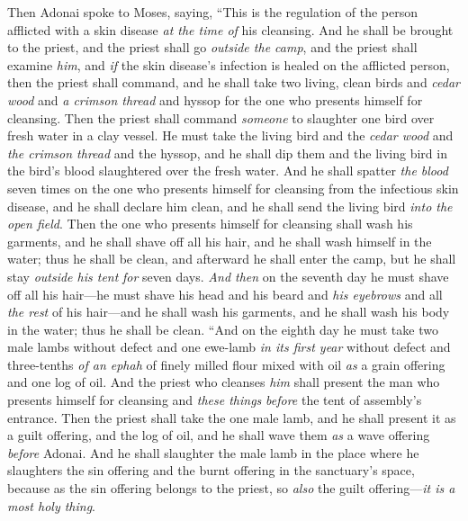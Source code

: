\begin{biblechapter} %
 Then Adonai spoke to Moses, saying,
\verse “This is the regulation of the person afflicted with a skin disease \textit{at the time of} his cleansing. And he shall be brought to the priest,
\verse and the priest shall go \textit{outside the camp}, and the priest shall examine \textit{him}, and \textit{if} the skin disease’s infection is healed on the afflicted person,
\verse then the priest shall command, and he shall take two living, clean birds and \textit{cedar wood} and \textit{a crimson thread} and hyssop for the one who presents himself for cleansing.
\verse Then the priest shall command \textit{someone} to slaughter one bird over fresh water in a clay vessel.
\verse He must take the living bird and the \textit{cedar wood} and \textit{the crimson thread} and the hyssop, and he shall dip them and the living bird in the bird’s blood slaughtered over the fresh water.
\verse And he shall spatter \textit{the blood} seven times on the one who presents himself for cleansing from the infectious skin disease, and he shall declare him clean, and he shall send the living bird \textit{into the open field}.
\verse Then the one who presents himself for cleansing shall wash his garments, and he shall shave off all his hair, and he shall wash himself in the water; thus he shall be clean, and afterward he shall enter the camp, but he shall stay \textit{outside his tent} \textit{for} seven days.
\verse \textit{And then} on the seventh day he must shave off all his hair—he must shave his head and his beard and \textit{his eyebrows} and all \textit{the rest} of his hair—and he shall wash his garments, and he shall wash his body in the water; thus he shall be clean.
\verse “And on the eighth day he must take two male lambs without defect and one ewe-lamb \textit{in its first year} without defect and three-tenths \textit{of an ephah} of finely milled flour mixed with oil \textit{as} a grain offering and one log of oil.
\verse And the priest who cleanses \textit{him} shall present the man who presents himself for cleansing and \textit{these things} \textit{before} the tent of assembly’s entrance.
\verse Then the priest shall take the one male lamb, and he shall present it as a guilt offering, and the log of oil, and he shall wave them \textit{as} a wave offering \textit{before} Adonai.
\verse And he shall slaughter the male lamb in the place where he slaughters the sin offering and the burnt offering in the sanctuary’s space, because as the sin offering belongs to the priest, so \textit{also} the guilt offering—\textit{it is a most holy thing}.

\end{biblechapter}
